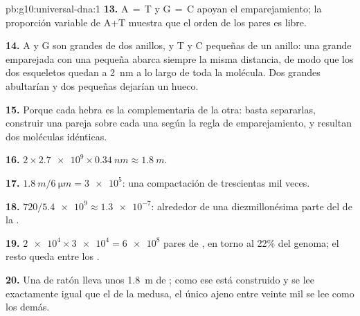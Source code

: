 \begin{solution}{pb:g10:universal-dna:1}
\textbf{13.} A$\,=\,$T y G$\,=\,$C apoyan el emparejamiento; la
proporción variable de A+T muestra que el orden de los pares es libre.

\textbf{14.} A y G son  grandes de dos anillos, y T y C 
pequeñas de un anillo: una grande emparejada con una pequeña abarca
siempre la misma distancia, de modo que los dos esqueletos quedan a
\qty{2}{nm} a lo largo de toda la molécula. Dos  grandes
abultarían y dos pequeñas dejarían un hueco.

\textbf{15.} Porque cada hebra es la complementaria de la otra:
basta separarlas, construir una pareja sobre cada una según la regla de
emparejamiento, y resultan dos moléculas idénticas.

\textbf{16.} $2 \times \num{2.7e9} \times \qty{0.34}{nm} \approx
\qty{1.8}{m}$.

\textbf{17.} $\qty{1.8}{m} / \qty{6}{\micro m} = \num{3e5}$: una
compactación de trescientas mil veces.

\textbf{18.} $720 / \num{5.4e9} \approx \num{1.3e-7}$: alrededor de una
diezmillonésima parte del  de la .

\textbf{19.} $\num{2e4} \times \num{3e4} = \num{6e8}$ pares de ,
en torno al 22\% del genoma; el resto queda entre los .

\textbf{20.} Una  de ratón lleva unos \qty{1.8}{m} de ; como
ese  está construido y se lee exactamente igual que el de la medusa,
el único  ajeno entre veinte mil se lee como los demás.
\end{solution}
